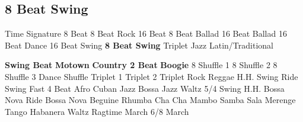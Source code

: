 \subsection{8 Beat Swing}
Time Signature
8 Beat
8 Beat Rock
16 Beat
8 Beat Ballad
16 Beat Ballad
16 Beat Dance
16 Beat Swing
\textbf{8 Beat Swing}
Triplet
Jazz
Latin/Traditional





























\textbf{Swing Beat}
\textbf{Motown}
\textbf{Country 2 Beat}
\textbf{Boogie}
8 Shuffle 1
8 Shuffle 2
8 Shuffle 3
Dance Shuffle
Triplet 1
Triplet 2
Triplet Rock
Reggae
H.H. Swing
Ride Swing
Fast 4 Beat
Afro Cuban
Jazz Bossa
Jazz Waltz
5/4 Swing
H.H. Bossa Nova
Ride Bossa Nova
Beguine
Rhumba
Cha Cha
Mambo
Samba
Sala
Merenge
Tango
Habanera
Waltz
Ragtime
March
6/8 March
